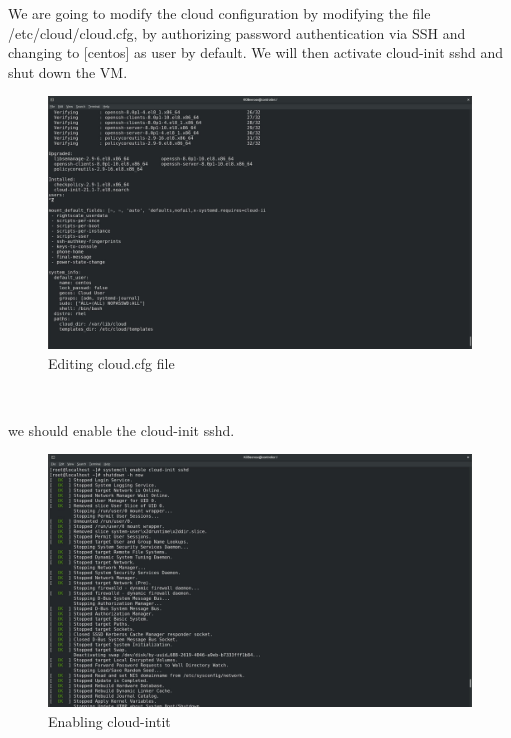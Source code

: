 \begin{spacing}{1.2}
\par We are going to modify the cloud configuration by modifying the file /etc/cloud/cloud.cfg,
by authorizing password authentication via SSH and changing to [centos] as user
by default. We will then activate cloud-init sshd and shut down the VM. 
\\
\begin{figure}[!htb] 
\begin{center} 
\includegraphics[width=1\linewidth]{Cloud/Add Virtual Machine Images/Add VM Images/Editing cloud.cfg file} 
\end{center} 
\caption{Editing cloud.cfg file} 
\end{figure}  \FloatBarrier
\\

\par we should enable the cloud-init sshd.
\\
\begin{figure}[!htb] 
\begin{center} 
\includegraphics[width=1\linewidth]{Cloud/Add Virtual Machine Images/Add VM Images/Enabling cloud-intit} 
\end{center} 
\caption{Enabling cloud-intit} 
\end{figure}  \FloatBarrier
\\


\end{spacing}
